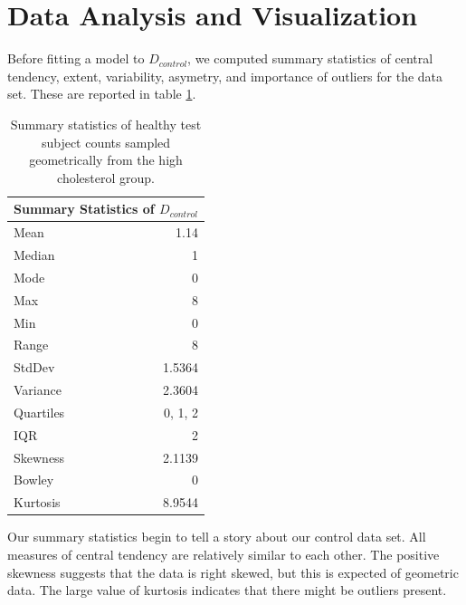 \documentclass{amsart}
\begin{document}
\section{Data Analysis and Visualization}
Before fitting a model to $D_{control}$, we computed summary statistics of central tendency, extent, variability, asymetry, and importance of outliers for the data set. These are reported in table \ref{Tbl:statistics}.
\begin{table}[h]
\centering
\begin{tabular}{lr}
\toprule
\multicolumn{2}{c}{\textbf{Summary Statistics of $D_{control}$}}\\
\midrule
Mean & 1.14 \\
Median& 1\\
Mode& 0\\
Max& 8\\
Min& 0\\
Range& 8\\
StdDev& 1.5364\\
Variance& 2.3604\\
Quartiles& 0, 1, 2\\
IQR& 2\\
Skewness& 2.1139\\
Bowley& 0\\
Kurtosis& 8.9544\\
\bottomrule
\end{tabular}
\caption{Summary statistics of healthy test subject counts sampled geometrically from the high cholesterol group.\label{Tbl:statistics}}
\end{table}
Our summary statistics begin to tell a story about our control data set. All measures of central tendency are relatively similar to each other. The positive skewness suggests that the data is right skewed, but this is expected of geometric data. The large value of kurtosis indicates that there might be outliers present.
\end{document}
